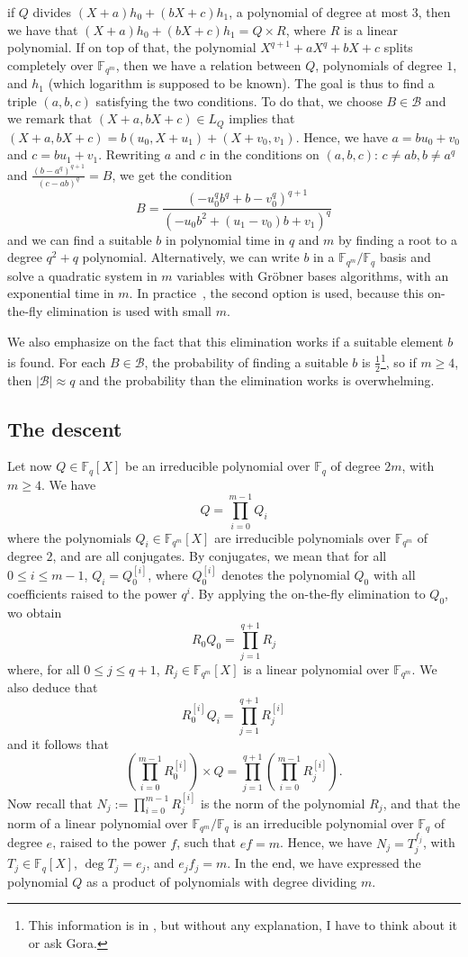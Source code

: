 \documentclass[a4paper,11pt]{article}
\theoremstyle{break}
\theoremstyle{sc}
\theoremstyle{definition}
\theoremstyle{remark}
\begin{document}
if $Q$ divides $(X+a)h_0+(bX+c)h_1$, a polynomial of degree at most $3$, then we
have that $(X+a)h_0+(bX+c)h_1=Q\times R$, where $R$ is a linear polynomial. If
on top of that, the polynomial $X^{q+1}+aX^q+bX+c$ splits completely over
$\mathbb{F}_{q^m}$, then we have a relation between $Q$, polynomials of degree
$1$, and $h_1$ (which logarithm is supposed to be known). The goal is thus to
find a triple $(a, b, c)$ satisfying the two conditions. To do that, we choose
$B\in \mathcal B$ and we remark that $(X+a,
bX+c)\in L_Q$ implies that $(X+a, bX+c)=b(u_0, X+u_1)+(X+v_0, v_1)$. Hence, we
have $a=bu_0+v_0$ and $c=bu_1+v_1$. Rewriting $a$ and $c$ in the conditions
on $(a,b,c)$: $c\neq ab,b\neq a^q$ and $\frac{(b-a^q)^{q+1}}{(c-ab)^q}=B$, we
get the condition
\[
  B = \frac{(-u_0^qb^q+b-v_0^q)^{q+1}}{(-u_0b^2+(u_1-v_0)b+v_1)^q}
\]
and we can find a suitable $b$ in polynomial time in $q$ and $m$ by finding a root to a degree
$q^2+q$ polynomial. Alternatively, we can write $b$ in a $\mathbb{F}_{q^m}/\mathbb{F}_q$
basis and solve a quadratic system in $m$ variables with Gröbner bases
algorithms, with an exponential time in $m$. In practice~\cite{Adj16}, the
second option is used, because this on-the-fly elimination is used with small $m$.

We also emphasize on the fact that this elimination works if a suitable element
$b$ is found. For each $B\in\mathcal B$, the probability of finding a suitable
$b$ is $\frac{1}{2}$\footnote{This information is in \cite{Adj16}, but
without any explanation, I have to think about it or ask Gora.}, so if
$m\geq4$, then $|\mathcal B|\approx q$ and the probability than the
elimination works is overwhelming.

\subsection{The descent}

Let now $Q\in\mathbb{F}_{q}[X]$ be an irreducible polynomial over $\mathbb{F}_{q}$ of degree
$2m$, with $m\geq4$. We have
\[
  Q = \prod_{i=0}^{m-1}Q_{i}
\]
where the polynomials $Q_i\in\mathbb{F}_{q^m}[X]$ are irreducible
polynomials over $\mathbb{F}_{q^m}$ of degree $2$, and are all
conjugates. By conjugates, we mean that for all $0\leq i\leq m-1$,
$Q_i=Q_0^{[i]}$, where $Q_0^{[i]}$ denotes the polynomial $Q_0$ with all
coefficients raised to the power $q^i$. By applying the on-the-fly
elimination to $Q_0$, wo obtain 
\[
  R_0Q_0=\prod_{j=1}^{q+1}R_j
\]
where, for all $0\leq j\leq q+1$, $R_j\in\mathbb{F}_{q^m}[X]$ is a linear
polynomial over $\mathbb{F}_{q^m}$. We also deduce that
\[
  R_{0}^{[i]}Q_i=\prod_{j=1}^{q+1}R_j^{[i]}
\]
and it follows that
\[
  (\prod_{i=0}^{m-1}R_{0}^{[i]})\times Q =
  \prod_{j=1}^{q+1}(\prod_{i=0}^{m-1}R_j^{[i]}).
\]
Now recall that $N_j:=\prod_{i=0}^{m-1}R_{j}^{[i]}$ is the norm of the
polynomial $R_j$, and that the norm of a linear polynomial over
$\mathbb{F}_{q^m}/\mathbb{F}_q$ is an irreducible polynomial over
$\mathbb{F}_q$ of degree
$e$, raised to the power $f$, such that $ef=m$. Hence, we have
$N_j=T_j^{f_j}$, with $T_j\in\mathbb{F}_{q}[X]$, $\deg T_j = e_j$, and
$e_jf_j=m$. In the end, we have expressed the polynomial $Q$ as a product of
polynomials with degree dividing $m$.
\end{document}
